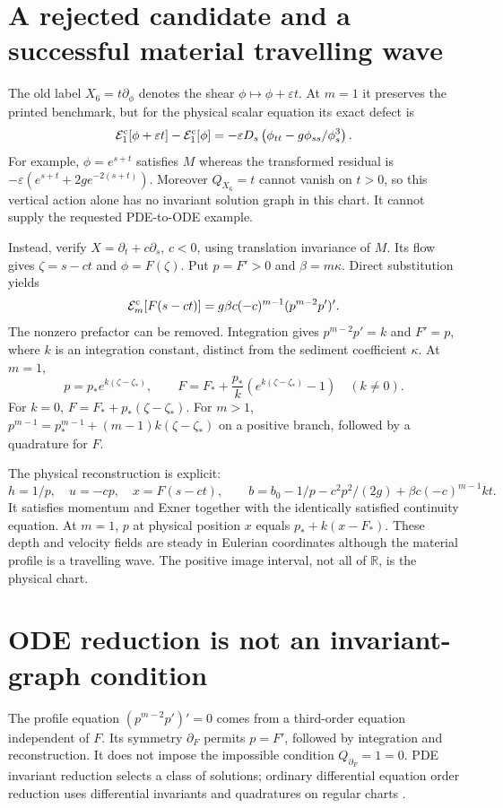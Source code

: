 \documentclass[12pt,a4paper,oneside]{report}
\numberwithin{equation}{chapter}
\theoremstyle{remark}\newtheorem{remark}[theorem]{Remark}
\newcommand{\E}{\mathcal E}
\begin{document}
\section{A rejected candidate and a successful material travelling wave}
The old label $X_6=t\partial_\phi$ denotes the shear $\phi\mapsto\phi+\varepsilon t$. At $m=1$ it preserves the printed benchmark, but for the physical scalar equation its exact defect is
\[
 \E_1^{\rm c}[\phi+\varepsilon t]-\E_1^{\rm c}[\phi]
 =-\varepsilon D_s\left(\phi_{tt}-g\phi_{ss}/\phi_s^3\right).
\]
For example, $\phi=e^{s+t}$ satisfies $M$ whereas the transformed residual is $-\varepsilon(e^{s+t}+2ge^{-2(s+t)})$. Moreover $Q_{X_6}=t$ cannot vanish on $t>0$, so this vertical action alone has no invariant solution graph in this chart. It cannot supply the requested PDE-to-ODE example.

Instead, verify $X=\partial_t+c\partial_s$, $c<0$, using translation invariance of $M$. Its flow gives $\zeta=s-ct$ and $\phi=F(\zeta)$. Put $p=F'>0$ and $\beta=m\kappa$. Direct substitution yields
\[
 \E_m^{\rm c}[F(s-ct)]
 =g\beta c(-c)^{m-1}(p^{m-2}p')'.
\]
The nonzero prefactor can be removed. Integration gives $p^{m-2}p'=k$ and $F'=p$, where $k$ is an integration constant, distinct from the sediment coefficient $\kappa$. At $m=1$,
\begin{equation}\label{eq:rev8-travel}
 p=p_*e^{k(\zeta-\zeta_*)},\qquad
 F=F_*+\frac{p_*}{k}\left(e^{k(\zeta-\zeta_*)}-1\right)\quad(k\ne0).
\end{equation}
For $k=0$, $F=F_*+p_*(\zeta-\zeta_*)$. For $m>1$,
$p^{m-1}=p_*^{m-1}+(m-1)k(\zeta-\zeta_*)$ on a positive branch, followed by a quadrature for $F$.

The physical reconstruction is explicit:
\[
 h=1/p,\quad u=-cp,\quad x=F(s-ct),\qquad
 b=b_0-1/p-c^2p^2/(2g)+\beta c(-c)^{m-1}kt.
\]
It satisfies momentum and Exner together with the identically satisfied continuity equation. At $m=1$, $p$ at physical position $x$ equals $p_*+k(x-F_*)$. These depth and velocity fields are steady in Eulerian coordinates although the material profile is a travelling wave. The positive image interval, not all of $\mathbb R$, is the physical chart.

\section{ODE reduction is not an invariant-graph condition}
The profile equation $(p^{m-2}p')'=0$ comes from a third-order equation independent of $F$. Its symmetry $\partial_F$ permits $p=F'$, followed by integration and reconstruction. It does not impose the impossible condition $Q_{\partial_F}=1=0$. PDE invariant reduction selects a class of solutions; ordinary differential equation order reduction uses differential invariants and quadratures on regular charts \cite{olver}.
\end{document}
